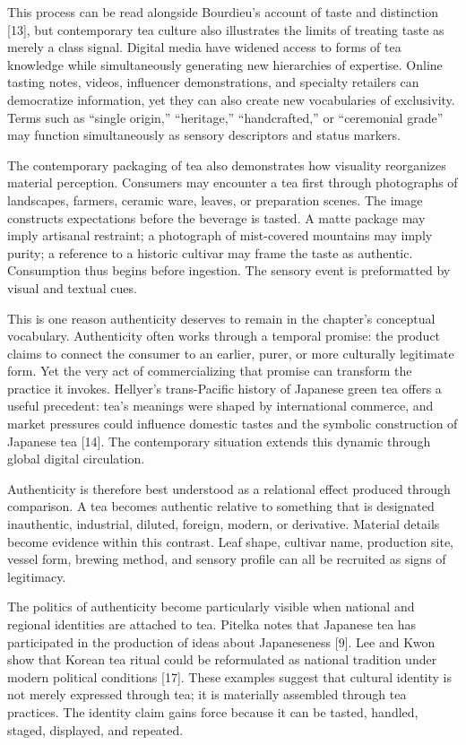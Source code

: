 \documentclass[11pt,a4paper]{article}
\begin{document}
This process can be read alongside Bourdieu's account of taste and distinction [13], but contemporary tea culture also illustrates the limits of treating taste as merely a class signal. Digital media have widened access to forms of tea knowledge while simultaneously generating new hierarchies of expertise. Online tasting notes, videos, influencer demonstrations, and specialty retailers can democratize information, yet they can also create new vocabularies of exclusivity. Terms such as ``single origin,'' ``heritage,'' ``handcrafted,'' or ``ceremonial grade'' may function simultaneously as sensory descriptors and status markers.

The contemporary packaging of tea also demonstrates how visuality reorganizes material perception. Consumers may encounter a tea first through photographs of landscapes, farmers, ceramic ware, leaves, or preparation scenes. The image constructs expectations before the beverage is tasted. A matte package may imply artisanal restraint; a photograph of mist-covered mountains may imply purity; a reference to a historic cultivar may frame the taste as authentic. Consumption thus begins before ingestion. The sensory event is preformatted by visual and textual cues.

This is one reason authenticity deserves to remain in the chapter's conceptual vocabulary. Authenticity often works through a temporal promise: the product claims to connect the consumer to an earlier, purer, or more culturally legitimate form. Yet the very act of commercializing that promise can transform the practice it invokes. Hellyer's trans-Pacific history of Japanese green tea offers a useful precedent: tea's meanings were shaped by international commerce, and market pressures could influence domestic tastes and the symbolic construction of Japanese tea [14]. The contemporary situation extends this dynamic through global digital circulation.

Authenticity is therefore best understood as a relational effect produced through comparison. A tea becomes authentic relative to something that is designated inauthentic, industrial, diluted, foreign, modern, or derivative. Material details become evidence within this contrast. Leaf shape, cultivar name, production site, vessel form, brewing method, and sensory profile can all be recruited as signs of legitimacy.

The politics of authenticity become particularly visible when national and regional identities are attached to tea. Pitelka notes that Japanese tea has participated in the production of ideas about Japaneseness [9]. Lee and Kwon show that Korean tea ritual could be reformulated as national tradition under modern political conditions [17]. These examples suggest that cultural identity is not merely expressed through tea; it is materially assembled through tea practices. The identity claim gains force because it can be tasted, handled, staged, displayed, and repeated.
\end{document}
